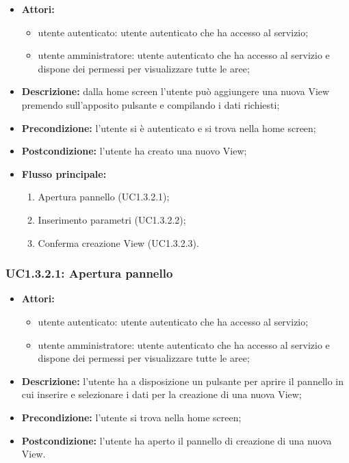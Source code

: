 \begin{itemize}
    \item \textbf{Attori:}
    \begin{itemize}
    	\item utente autenticato: utente autenticato che ha accesso al servizio;
    	\item utente amministratore: utente autenticato che ha accesso al servizio e dispone dei permessi per visualizzare tutte le aree;
	\end{itemize}
    \item \textbf{Descrizione:} dalla home screen l'utente può aggiungere una nuova View premendo sull'apposito pulsante e compilando i dati richiesti;
    \item \textbf{Precondizione:} l'utente si è autenticato e si trova nella home screen;
    \item \textbf{Postcondizione:} l'utente ha creato una nuovo View;
	\item \textbf{Flusso principale:}

    \begin{enumerate}
        \item Apertura pannello (UC1.3.2.1);
        \item Inserimento parametri (UC1.3.2.2);
        \item Conferma creazione View (UC1.3.2.3).
    \end{enumerate}

\end{itemize}

\subsubsection{UC1.3.2.1: Apertura pannello}

\begin{itemize}
    \item \textbf{Attori:}
    \begin{itemize}
    	\item utente autenticato: utente autenticato che ha accesso al servizio;
    	\item utente amministratore: utente autenticato che ha accesso al servizio e dispone dei permessi per visualizzare tutte le aree;
	\end{itemize}
    \item \textbf{Descrizione:} l'utente ha a disposizione un pulsante per aprire il pannello in cui inserire e selezionare i dati per la creazione di una nuova View;
    \item \textbf{Precondizione:} l'utente si trova nella home screen;
    \item \textbf{Postcondizione:} l'utente ha aperto il pannello di creazione di una nuova View.
\end{itemize}

